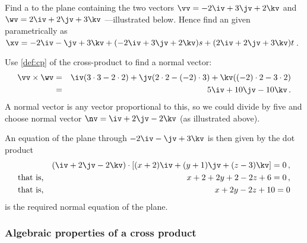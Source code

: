 \begin{example} \label{eg:cpnvp}
Find a  to the plane containing the two vectors \(\vv=-2\iv+3\jv+2\kv\) and \(\wv=2\iv+2\jv+3\kv\) ---illustrated below.
Hence find an  given parametrically as \(\xv=-2\iv-\jv+3\kv+(-2\iv+3\jv+2\kv)s+(2\iv+2\jv+3\kv)t\)\,.
%
\begin{center}
\end{center}
\begin{solution} 
Use \cref{def:cp} of the cross-product to find a normal vector:
\begin{eqnarray*}
\vv\times\wv&=&
\iv(3\cdot 3-2\cdot 2)
+\jv(2\cdot 2-(-2)\cdot 3)
+\kv((-2)\cdot 2-3\cdot 2)
\\&=&5\iv+10\jv-10\kv\,.
\end{eqnarray*}
A normal vector is any vector proportional to this, so we could divide by five and choose normal vector \(\nv=\iv+2\jv-2\kv\) (as illustrated above).

An equation of the plane through \(-2\iv-\jv+3\kv\) is then given by the dot product
\begin{eqnarray*}
&&(\iv+2\jv-2\kv)\cdot[(x+2)\iv+(y+1)\jv+(z-3)\kv]=0\,,
\\\text{that is,}&& x+2+2y+2-2z+6=0\,,
\\\text{that is,}&& x+2y-2z+10=0
\end{eqnarray*}
is the required normal equation of the plane.
\end{solution}
\end{example}




\subsubsection{Algebraic properties of a cross product}

